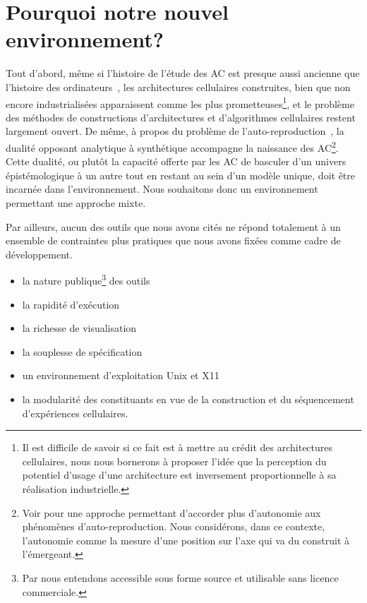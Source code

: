 \section{Pourquoi notre nouvel environnement?}

Tout d'abord, m\^eme si l'histoire de l'\'etude des AC est presque aussi
ancienne que l'histoire des ordinateurs~\cite[]{Metropolis93b}, les
architectures cellulaires construites, bien que non encore
industrialis\'ees apparaissent comme les plus prometteuses\footnote{%
  Il est difficile de savoir si ce fait est \`a mettre au cr\'edit des
  architectures cellulaires, nous nous bornerons \`a proposer l'id\'ee que
  la perception du potentiel d'usage d'une architecture est
  inversement proportionnelle \`a sa r\'ealisation industrielle.}, %
et le probl\`eme des m\'ethodes de constructions d'architectures et
d'algorithmes cellulaires restent largement ouvert. %
De m\^eme, \`a propos du probl\`eme de
l'auto-reproduction~\cite[]{vonNeumann66}, la dualit\'e opposant
analytique \`a synth\'etique accompagne la naissance des AC\footnote{%
  Voir \cite{Reggia93} pour une approche permettant d'accorder plus
  d'autonomie aux ph\'enom\`enes d'auto-reproduction. %
  Nous consid\'erons, dans ce contexte, l'autonomie comme la mesure
  d'une position sur l'axe qui va du construit \`a l'\'emergeant.}. %
Cette dualit\'e, ou plut\^ot la capacit\'e offerte par les AC de basculer
d'un univers \'epist\'emologique \`a un autre tout en restant au sein d'un
mod\`ele unique, doit \^etre incarn\'ee dans l'environnement. %
Nous souhaitons donc un environnement permettant une approche mixte. %

Par ailleurs, aucun des outils que nous avons cit\'es ne r\'epond
totalement \`a un ensemble de contraintes plus pratiques que nous avons
fix\'ees comme cadre de d\'eveloppement. %
\begin{itemize}
\item la nature publique\footnote{%
    Par  nous entendons accessible sous forme
    source et utilisable sans licence commerciale.} %
  des outils
\item la rapidit\'e d'ex\'ecution
\item la richesse de visualisation
\item la souplesse de sp\'ecification
\item un environnement d'exploitation Unix et X11
\item la modularit\'e des constituants en vue de la construction et du
  s\'equencement d'exp\'eriences cellulaires. %
\end{itemize}

